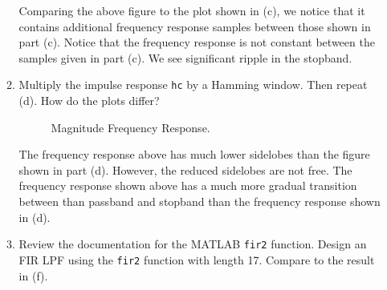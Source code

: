 \documentclass[fleqn]{article}
\begin{document}
\begin{enumerate}
\begin{enumerate}[nolistsep]
			Comparing the above figure to the plot shown in (c), we notice that it contains additional frequency response samples between those shown in part (c). Notice that the frequency response is not constant between the samples given in part (c). We see significant ripple in the stopband.
			
			\item Multiply the impulse response \texttt{hc} by a Hamming window. Then repeat (d). How do the plots differ?
			
			\begin{figure}[H]
				\centerline{}
				\caption{Magnitude Frequency Response.}
			\end{figure}
			
			The frequency response above has much lower sidelobes than the figure shown in part (d). However, the reduced sidelobes are not free. The frequency response shown above has a much more gradual transition between than passband and stopband than the frequency response shown in (d).
			
			\item Review the documentation for the MATLAB \texttt{fir2} function. Design an FIR LPF using the \texttt{fir2} function with length 17. Compare to the result in (f).
		\end{enumerate}
	\end{enumerate}
	
	
	
\end{document}

